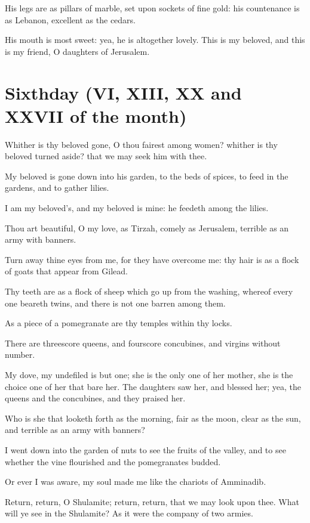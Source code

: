 His legs are as pillars of marble, set upon sockets of fine gold: his countenance is as Lebanon, excellent as the cedars.

His mouth is most sweet: yea, he is altogether lovely. This is my beloved, and this is my friend, O daughters of Jerusalem.

\section{Sixthday (VI, XIII, XX and XXVII of the month)}

Whither is thy beloved gone, O thou fairest among women? whither is thy beloved turned aside? that we may seek him with thee.

My beloved is gone down into his garden, to the beds of spices, to feed in the gardens, and to gather lilies.

I am my beloved's, and my beloved is mine: he feedeth among the lilies.

Thou art beautiful, O my love, as Tirzah, comely as Jerusalem, terrible as an army with banners.

Turn away thine eyes from me, for they have overcome me: thy hair is as a flock of goats that appear from Gilead.

Thy teeth are as a flock of sheep which go up from the washing, whereof every one beareth twins, and there is not one barren among them.

As a piece of a pomegranate are thy temples within thy locks.

There are threescore queens, and fourscore concubines, and virgins without number.

My dove, my undefiled is but one; she is the only one of her mother, she is the choice one of her that bare her. The daughters saw her, and blessed her; yea, the queens and the concubines, and they praised her.

Who is she that looketh forth as the morning, fair as the moon, clear as the sun, and terrible as an army with banners?

I went down into the garden of nuts to see the fruits of the valley, and to see whether the vine flourished and the pomegranates budded.

Or ever I was aware, my soul made me like the chariots of Amminadib.

Return, return, O Shulamite; return, return, that we may look upon thee. What will ye see in the Shulamite? As it were the company of two armies.


